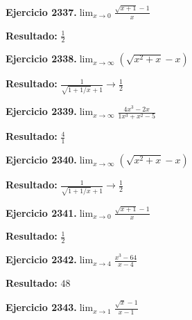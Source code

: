 \documentclass[10pt,a4paper]{article}
\begin{document}
\begin{ejbox}
\textbf{Ejercicio 2337.}\quad $\lim_{x\to 0} \frac{\sqrt{x+1}-1}{x}$
\end{ejbox}

\begin{solbox}
\textbf{Resultado:} \(\displaystyle \frac{1}{2}\)
\end{solbox}

\begin{ejbox}
\textbf{Ejercicio 2338.}\quad $\lim_{x\to \infty} (\sqrt{x^2+x} - x)$
\end{ejbox}

\begin{solbox}
\textbf{Resultado:} \(\displaystyle \frac{1}{\sqrt{1+1/x}+1} \to \frac{1}{2}\)
\end{solbox}

\newpage
\begin{ejbox}
\textbf{Ejercicio 2339.}\quad $\lim_{x\to \infty} \frac{4x^3 - 2x}{1x^3 + x^2 - 5}$
\end{ejbox}

\begin{solbox}
\textbf{Resultado:} \(\displaystyle \frac{4}{1}\)
\end{solbox}

\begin{ejbox}
\textbf{Ejercicio 2340.}\quad $\lim_{x\to \infty} (\sqrt{x^2+x} - x)$
\end{ejbox}

\begin{solbox}
\textbf{Resultado:} \(\displaystyle \frac{1}{\sqrt{1+1/x}+1} \to \frac{1}{2}\)
\end{solbox}

\begin{ejbox}
\textbf{Ejercicio 2341.}\quad $\lim_{x\to 0} \frac{\sqrt{x+1}-1}{x}$
\end{ejbox}

\begin{solbox}
\textbf{Resultado:} \(\displaystyle \frac{1}{2}\)
\end{solbox}

\newpage
\begin{ejbox}
\textbf{Ejercicio 2342.}\quad $\lim_{x\to 4} \frac{x^3-64}{x-4}$
\end{ejbox}

\begin{solbox}
\textbf{Resultado:} \(\displaystyle 48\)
\end{solbox}

\begin{ejbox}
\textbf{Ejercicio 2343.}\quad $\lim_{x\to 1} \frac{\sqrt{x}-1}{x-1}$
\end{ejbox}
\end{document}
